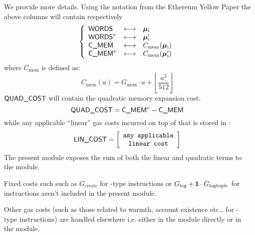 We provide more details. Using the notation from the Ethereum Yellow Paper  the above columns will contain respectively
\[
	\left\{ \begin{array}{lcl}
		\textsf{WORDS}     & \longleftrightarrow & \bm{\mu}_\text{i}                  \\
		\textsf{WORDS}^{\nu} & \longleftrightarrow & \bm{\mu}_\text{i}'                 \\
		\textsf{C\_MEM}     & \longleftrightarrow & C_\textrm{mem}(\bm{\mu}_\text{i})  \\
		\textsf{C\_MEM}^{\nu} & \longleftrightarrow & C_\textrm{mem}(\bm{\mu}_\text{i}') \\
	\end{array} \right.
\]
where $C_\textrm{mem}$ is defined as:
\[
	C_\textrm{mem}(a) =
	G_\textrm{mem}\cdot a
	+
	\left\lfloor\frac{a^2}{512}\right\rfloor
\]
$\textsf{QUAD\_COST}$ will contain the quadratic memory expansion cost:
\[
	\textsf{QUAD\_COST} =
	\textsf{C\_MEM}^{\nu} - \textsf{C\_MEM}
\]
while any applicable ``linear'' gas costs incurred on top of that is stored in \mxpLinGas{}:
\[
	\textsf{LIN\_COST} =
	\left[ \begin{array}{c}
			\texttt{any applicable} \\
			\texttt{linear cost}    \\
		\end{array} \right]
\]
\saNote{} The present module exposes the sum of both the linear and quadratic terms to the \hubMod{} module.

\saNote{} Fixed costs such such as $G_\text{create}$ for -type instructions or $G_\text{log} + \texttt{X} \cdot G_\text{logtopic}$ for  instructions aren't included in the present module.

\saNote{} Other gas costs (such as those related to warmth, account existence etc\dots{} for -type instructions) are handled elsewhere i.e. either in the \hubMod{} module directly or in the \stpMod{} module.
